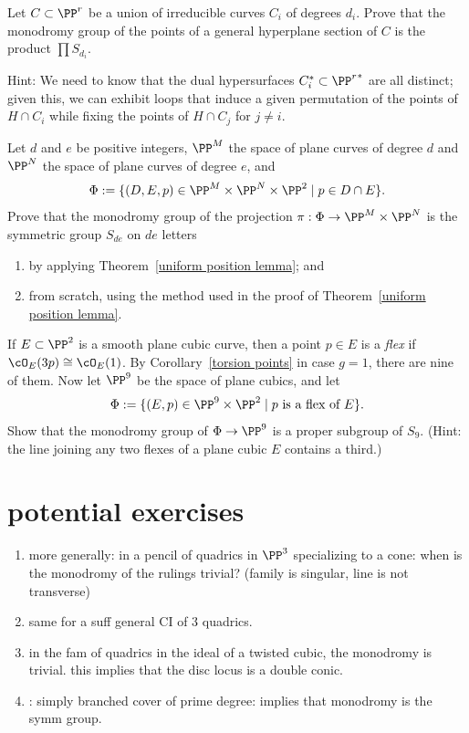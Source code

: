 \begin{exercise}
Let $C \subset \PP^r$ be a union of irreducible curves $C_i$ of degrees $d_i$. Prove that the monodromy group of the points of a general hyperplane section of $C$ is the product $\prod S_{d_i}$.
\end{exercise}

Hint: We need to know that the dual hypersurfaces $C_i^* \subset {\PP^r}^*$ are all distinct; given this, we can exhibit loops that induce a given permutation of the points of $H \cap C_i$ while fixing the points of $H \cap C_j$ for $j \neq i$.

\begin{exercise}
Let $d$ and $e$ be positive integers, $\PP^M$ the space of plane curves of degree $d$ and $\PP^N$ the space of plane curves of degree $e$, and
$$
\Phi := \{ (D, E, p) \in \PP^M \times \PP^N \times \PP^2 \mid p \in D \cap E \}.
$$
Prove that the monodromy group of the projection $\pi : \Phi \to \PP^M \times \PP^N$ is the symmetric group $S_{de}$ on $de$ letters
\begin{enumerate}
\item by applying Theorem~\ref{uniform position lemma}; and
\item from scratch, using the method used in the proof of Theorem~\ref{uniform position lemma}.
\end{enumerate}
\end{exercise}

\begin{exercise}
If $E \subset \PP^2$ is a smooth plane cubic curve, then a point $p \in E$ is  a \emph{flex} if $\cO_E(3p) \cong \cO_E(1)$. By Corollary~\ref{torsion points} in case $g=1$, there are nine of them. Now let $\PP^9$ be the space of plane cubics, and let
$$
\Phi := \{ (E, p) \in \PP^9 \times \PP^2 \mid p \text{ is a flex of } E \}.
$$
Show that the monodromy group of $\Phi \to \PP^9$ is a proper subgroup of $S_9$. (Hint: the line joining any two flexes of a plane cubic $E$ contains a third.)
\end{exercise}

\section{potential exercises}
\begin{enumerate}
 \item more generally: in a pencil of quadrics in $\PP^3$ specializing to a cone: when is the monodromy of the rulings trivial? (family is singular, line is not transverse)
 \item same for a suff general CI of 3 quadrics.
 \item in the fam of quadrics in the ideal of a twisted cubic, the monodromy is trivial. this implies that the disc locus is a double conic.
 \item: simply branched cover of prime degree: implies that monodromy is the symm group.
 
\end{enumerate}



